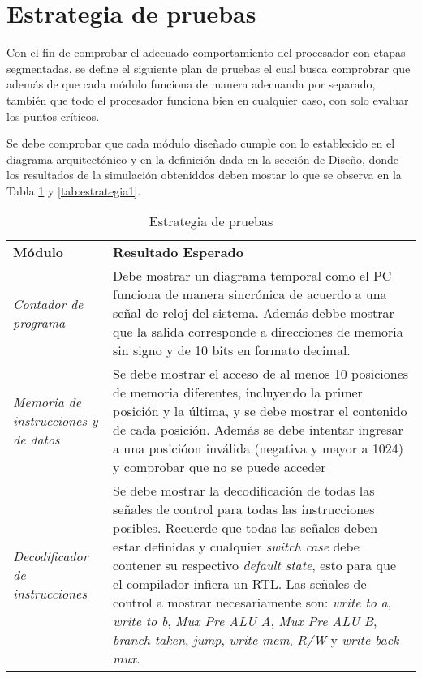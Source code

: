 \newpage
\section{Estrategia de pruebas}

\par Con el fin de comprobar el adecuado comportamiento del procesador con etapas segmentadas, se define el siguiente plan de pruebas el cual busca comprobrar que adem\' as de que cada m\' odulo funciona de manera adecuanda por separado, tambi\' en que todo el procesador funciona bien en cualquier caso, con solo evaluar los puntos cr\' iticos.

Se debe comprobar que cada m\' odulo dise\~ nado cumple con lo establecido en el diagrama arquitect\' onico y en la definici\' on dada en la secci\' on de Dise\~ no, donde los resultados de la simulaci\' on obteniddos deben mostar lo que se observa en la Tabla \ref{tab:estrategia} y \ref{tab:estrategia1}.

\begin{table}[h]
\begin{tabularx}{\textwidth}{l X}
{\bf M\' odulo}                           & {\bf Resultado Esperado}                            \\
{\it Contador de programa}                & Debe mostrar un diagrama temporal como el PC funciona de manera sincr\' onica de acuerdo a una se\~ nal de reloj del sistema. Adem\' as debbe mostrar que la salida corresponde a direcciones de memoria sin signo y de 10 bits en formato decimal.                   \\
{\it Memoria de instrucciones y de datos} & Se debe mostrar el acceso de al menos 10 posiciones de memoria diferentes, incluyendo la primer posici\' on y la \' ultima, y se debe mostrar el contenido de cada posici\' on. Adem\' as se debe intentar ingresar a una posici\' oon inv\' alida (negativa y mayor a 1024) y comprobar que no se puede acceder                           \\
{\it Decodificador de instrucciones}      & Se debe mostrar la decodificaci\' on  de todas las se\~ nales de control para todas las instrucciones posibles. Recuerde que todas las se\~ nales deben estar definidas y cualquier \textit{switch case} debe contener su respectivo \textit{default state}, esto para que el compilador infiera un RTL. Las se\~ nales de control a mostrar necesariamente son: \textit{write to a}, \textit{write to b}, \textit{Mux Pre ALU A}, \textit{Mux Pre ALU B}, \textit{branch taken}, \textit{jump}, \textit{write mem}, \textit{R/W} y \textit{write back mux}.              \\

\end{tabularx}
\caption{Estrategia de pruebas}
\label{tab:estrategia}
\end{table}


